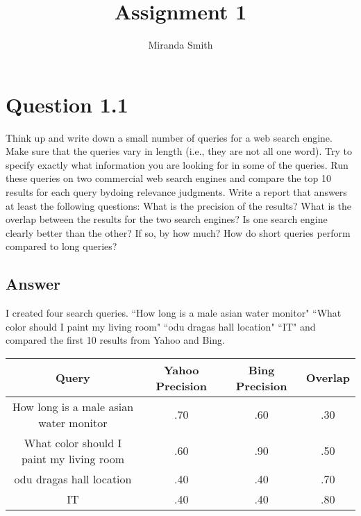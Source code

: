 \documentclass{article}
\begin{document}
\title{Assignment 1}
\author{Miranda Smith}

\maketitle



\section{Question 1.1}

 Think up and write down a small number of queries for a web search engine. Make sure that the queries vary in length (i.e., they are not all one word). 
 Try to specify exactly what information you are looking for in some of the queries.  Run these queries on two commercial web search engines and compare the top 10 results for each query bydoing relevance judgments.  Write a report that answers at least the following questions: 
 What is the precision of the results? 
 What is the overlap between the results for the two search engines? 
 Is one search engine clearly better than the other? If so, by how much? 
 How do short queries perform compared to long queries?


\subsection*{Answer}

I created four search queries.
``How long is a male asian water monitor"
``What color should I paint my living room"
``odu dragas hall location"
``IT"
and compared the first 10 results from Yahoo and Bing. 

\begin{center}
\begin{tabular}{ | c | c | c | c |}
\hline
\textbf{Query} & \textbf{Yahoo Precision} & \textbf{Bing Precision} & \textbf{Overlap}  \\
\hline
How long is a male asian water monitor & .70 & .60 & .30 \\ 
\hline
What color should I paint my living room & .60 & .90 & .50 \\ 
\hline
odu dragas hall location & .40 & .40 & .70  \\ 
\hline
IT & .40 & .40 & .80  \\ 
\hline
\end{tabular}
\end{center}
\end{document}

